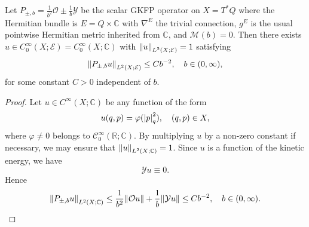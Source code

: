 \documentclass[10pt]{amsart}
\theoremstyle{definition}\newtheorem{defi}[theo]{Definition}\newtheorem{rema}[theo]{Remark}\newtheorem{exam}[theo]{Example}\newtheorem{exem}[theo]{Example}\newtheorem{nota}[theo]{Notation}
\newcommand{\C}{\mathbb{C}}
\newcommand{\R}{\mathbb{R}}
\newcommand{\clC}{\mathcal{C}}
\newcommand{\clY}{\mathcal{Y}}
\newcommand{\clO}{\mathcal{O}}
\newcommand{\clE}{\mathcal{E}}
\newcommand{\clM}{\mathcal{M}}
\newcommand{\abs}[1]{\left| #1 \right|}
\newcommand\norm[1]{\left\lVert#1\right\rVert}
\let\originalleft\left
\let\originalright\right
\renewcommand{\left}{\mathopen{}\mathclose\bgroup\originalleft}
\renewcommand{\right}{\aftergroup\egroup\originalright}
\begin{document}
\begin{prop}\label{quasimode_proposition}
Let $P_{\pm,b} = \frac{1}{b^2} \clO\pm \frac{1}{b}\clY$ be the scalar GKFP operator on $X = T^*Q$ where the Hermitian bundle is $E = Q \times \C$ with $\nabla^E$ the trivial connection, $g^E$ is the usual pointwise Hermitian metric inherited from $\C$, and $\clM(b)=0$. Then there exists $u \in C^\infty_{0}(X; \clE) = C^\infty_{0}(X; \C)$ with $\norm{u}_{L^2(X; \clE)} = 1$ satisfying
\begin{equation}\label{scalar_quasimode_bound}
\norm{P_{\pm,b}u}_{L^2(X;\clE)} \le Cb^{-2}, \quad b \in (0,\infty),
\end{equation}
for some constant $C>0$ independent of $b$.
\end{prop}
\begin{proof}
Let $u \in C^\infty(X; \C)$ be any function of the form
\begin{equation}
u(q,p) = \varphi(\abs{p}^2_q), \quad (q,p) \in X,
\end{equation}
where $\varphi\neq 0$ belongs to $\clC^{\infty}_{0}(\R;\C)$. By multiplying $u$ by a non-zero constant if necessary, we may ensure that $\norm{u}_{L^2(X; \C)} = 1$. Since $u$ is a function of the kinetic energy, we have
\begin{equation}
\clY u \equiv 0.
\end{equation}
Hence
\begin{equation}\label{harmonic_osc_applied_to_quasimode}
\norm{P_{\pm,b} u}_{L^2(X;\C)} \le \frac{1}{b^2} \norm{\clO u} + \frac{1}{b} \norm{\clY u} \le Cb^{-2}, \quad b \in (0,\infty).\qedhere
\end{equation}
\end{proof}
\end{document}
